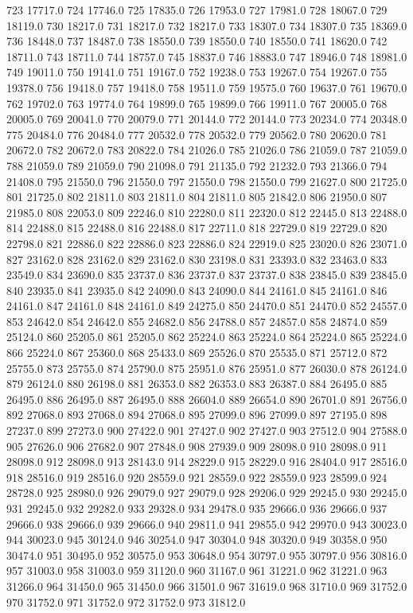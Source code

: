 723 17717.0
724 17746.0
725 17835.0
726 17953.0
727 17981.0
728 18067.0
729 18119.0
730 18217.0
731 18217.0
732 18217.0
733 18307.0
734 18307.0
735 18369.0
736 18448.0
737 18487.0
738 18550.0
739 18550.0
740 18550.0
741 18620.0
742 18711.0
743 18711.0
744 18757.0
745 18837.0
746 18883.0
747 18946.0
748 18981.0
749 19011.0
750 19141.0
751 19167.0
752 19238.0
753 19267.0
754 19267.0
755 19378.0
756 19418.0
757 19418.0
758 19511.0
759 19575.0
760 19637.0
761 19670.0
762 19702.0
763 19774.0
764 19899.0
765 19899.0
766 19911.0
767 20005.0
768 20005.0
769 20041.0
770 20079.0
771 20144.0
772 20144.0
773 20234.0
774 20348.0
775 20484.0
776 20484.0
777 20532.0
778 20532.0
779 20562.0
780 20620.0
781 20672.0
782 20672.0
783 20822.0
784 21026.0
785 21026.0
786 21059.0
787 21059.0
788 21059.0
789 21059.0
790 21098.0
791 21135.0
792 21232.0
793 21366.0
794 21408.0
795 21550.0
796 21550.0
797 21550.0
798 21550.0
799 21627.0
800 21725.0
801 21725.0
802 21811.0
803 21811.0
804 21811.0
805 21842.0
806 21950.0
807 21985.0
808 22053.0
809 22246.0
810 22280.0
811 22320.0
812 22445.0
813 22488.0
814 22488.0
815 22488.0
816 22488.0
817 22711.0
818 22729.0
819 22729.0
820 22798.0
821 22886.0
822 22886.0
823 22886.0
824 22919.0
825 23020.0
826 23071.0
827 23162.0
828 23162.0
829 23162.0
830 23198.0
831 23393.0
832 23463.0
833 23549.0
834 23690.0
835 23737.0
836 23737.0
837 23737.0
838 23845.0
839 23845.0
840 23935.0
841 23935.0
842 24090.0
843 24090.0
844 24161.0
845 24161.0
846 24161.0
847 24161.0
848 24161.0
849 24275.0
850 24470.0
851 24470.0
852 24557.0
853 24642.0
854 24642.0
855 24682.0
856 24788.0
857 24857.0
858 24874.0
859 25124.0
860 25205.0
861 25205.0
862 25224.0
863 25224.0
864 25224.0
865 25224.0
866 25224.0
867 25360.0
868 25433.0
869 25526.0
870 25535.0
871 25712.0
872 25755.0
873 25755.0
874 25790.0
875 25951.0
876 25951.0
877 26030.0
878 26124.0
879 26124.0
880 26198.0
881 26353.0
882 26353.0
883 26387.0
884 26495.0
885 26495.0
886 26495.0
887 26495.0
888 26604.0
889 26654.0
890 26701.0
891 26756.0
892 27068.0
893 27068.0
894 27068.0
895 27099.0
896 27099.0
897 27195.0
898 27237.0
899 27273.0
900 27422.0
901 27427.0
902 27427.0
903 27512.0
904 27588.0
905 27626.0
906 27682.0
907 27848.0
908 27939.0
909 28098.0
910 28098.0
911 28098.0
912 28098.0
913 28143.0
914 28229.0
915 28229.0
916 28404.0
917 28516.0
918 28516.0
919 28516.0
920 28559.0
921 28559.0
922 28559.0
923 28599.0
924 28728.0
925 28980.0
926 29079.0
927 29079.0
928 29206.0
929 29245.0
930 29245.0
931 29245.0
932 29282.0
933 29328.0
934 29478.0
935 29666.0
936 29666.0
937 29666.0
938 29666.0
939 29666.0
940 29811.0
941 29855.0
942 29970.0
943 30023.0
944 30023.0
945 30124.0
946 30254.0
947 30304.0
948 30320.0
949 30358.0
950 30474.0
951 30495.0
952 30575.0
953 30648.0
954 30797.0
955 30797.0
956 30816.0
957 31003.0
958 31003.0
959 31120.0
960 31167.0
961 31221.0
962 31221.0
963 31266.0
964 31450.0
965 31450.0
966 31501.0
967 31619.0
968 31710.0
969 31752.0
970 31752.0
971 31752.0
972 31752.0
973 31812.0
